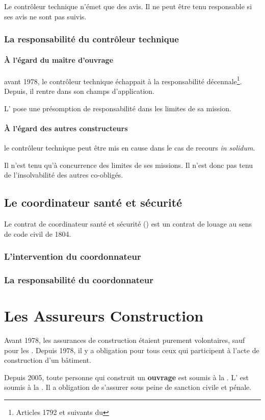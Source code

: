 					Le contrôleur technique n'émet que des avis. Il ne peut être tenu responsable si ses avis ne sont pas suivis.

			\subsubsection{La responsabilité du contrôleur technique}

				\paragraph{À l'égard du maître d'ouvrage}

					avant 1978, le contrôleur technique échappait à la responsabilité décennale\footnote{Articles 1792 et suivants du \cciv*}. Depuis, il rentre dans son champs d'application.

					L' pose une présomption de responsabilité dans les limites de sa mission.

				\paragraph{À l'égard des autres constructeurs}

					le contrôleur technique peut être mis en cause dans le cas de recours \emph{in solidum}.

					Il n'est tenu qu'à concurrence des limites de ses missions. Il n'est donc pas tenu de l'insolvabilité des autres co-obligés.

		\subsection{Le coordinateur santé et sécurité}

			Le contrat de coordinateur santé et sécurité (\CSPS) est un contrat de louage au sens de code civil de 1804.

			\subsubsection{L'intervention du coordonnateur}

			\subsubsection{La responsabilité du coordonnateur}

	\section{Les Assureurs Construction}

		Avant 1978, les assurances de construction étaient purement volontaires, sauf pour les \archi{}. Depuis 1978, il y a obligation pour tous ceux qui participent à l'acte de construction d'un bâtiment.

		Depuis 2005, toute personne qui construit un \textbf{ouvrage} est soumis à la \do{}. L'\E{} est soumis à la \rcd{}. Il a obligation de s'assurer sous peine de sanction civile et pénale.
